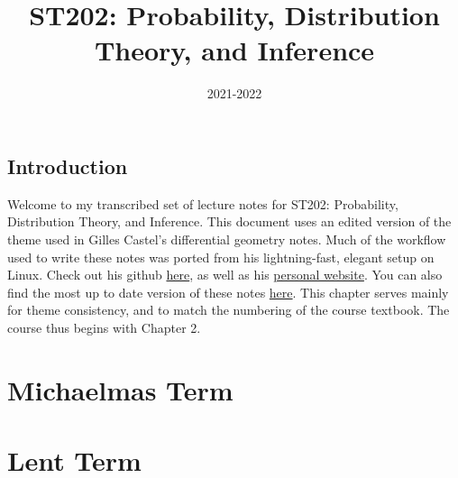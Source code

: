 \documentclass[a4paper]{report}
\title{\Huge\textsf{ST202: Probability, Distribution Theory, and Inference}}
\affil{\vskip.5cm\textsf{The London School of Economics and Political Science}}
\date{\textsf{2021-2022}}
\begin{document}
    \maketitle
    \tableofcontents
	\clearpage
\chapter{Introduction}
Welcome to my transcribed set of lecture notes for ST202: Probability, Distribution Theory, and Inference. This document uses an edited version of the theme used in Gilles Castel's differential geometry notes. Much of the workflow used to write these notes was ported from his lightning-fast, elegant setup on Linux. Check out his github \href{https://github.com/gillescastel}{here}, as well as his \href{https://castel.dev/}{personal website}. You can also find the most up to date version of these notes \href{https://github.com/meshkinyar/lecture-notes/tree/main/st202}{here}. This chapter serves mainly for theme consistency, and to match the numbering of the course textbook. The course thus begins with Chapter 2.
\part{Michaelmas Term}
    
    
    
    
    
    
    
    
    
    
    
    
    
    
    
    
    
    
    
    
    
\part{Lent Term}
    
    
    
    
    
    
    
    
    
    
    
    
    
    
    
    
    
    
    
    
    
\end{document}
